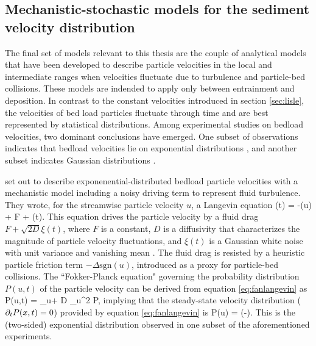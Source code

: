 \subsection{Mechanistic-stochastic models for the sediment velocity distribution}

The final set of models relevant to this thesis are the couple of analytical models that have been developed to describe particle velocities in the local and intermediate ranges when velocities fluctuate due to turbulence and particle-bed collisions. These models are indended to apply only between entrainment and deposition.
In contrast to the constant velocities introduced in section \ref{sec:lisle}, the velocities of bed load particles fluctuate through time and are best represented by statistical distributions. 
Among experimental studies on bedload velocities, two dominant conclusions have emerged. One subset of observations indicates that bedload velocities lie on exponential distributions \citep{Lajeunesse2010,Furbish2012,Fathel2015}, and another subset indicates Gaussian distributions \citep{Martin2012,Ancey2014,Heyman2016}.

\citet{Fan2014} set out to describe exponenential-distributed bedload particle velocities with a mechanistic model including a noisy driving term to represent fluid turbulence.
They wrote, for the streamwise particle velocity $u$, a Langevin equation
\be {}(t) = -\Delta {}(u) + F + \xi(t). \label{eq:fanlangevin}\ee
This equation drives the particle velocity by a fluid drag $F + \sqrt{2D} \xi(t)$, where $F$ is a constant, $D$ is a diffusivity that characterizes the magnitude of particle velocity fluctuations, and $\xi(t)$ is a Gaussian white noise with unit variance and vanishing mean \citep{Gardiner1983}. The fluid drag is resisted by a heuristic particle friction term $-\Delta \text{sgn}(u)$, introduced as a proxy for particle-bed collisions. The ``Fokker-Planck equation" governing the probability distribution $P(u,t)$ of the particle velocity can be derived from equation \ref{eq:fanlangevin} as \citep{Risken1984,VanKampen2007} 
\be \pt P(u,t) = \Delta\partial_u + D \partial_u^2 P,\ee
implying that the steady-state velocity distribution ($\partial_t P(x,t) = 0$) provided by equation \ref{eq:fanlangevin} is
\be P(u) = \exp\Big(-\Big).\ee
This is the (two-sided) exponential distribution observed in one subset of the aforementioned experiments.

